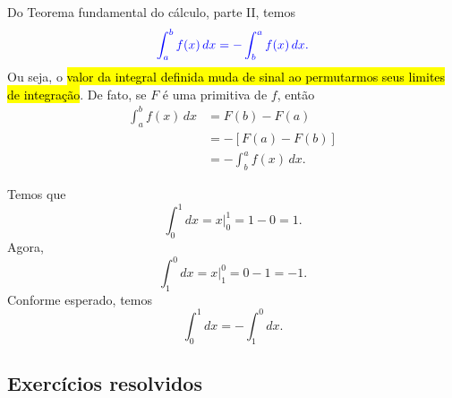 \begin{obs}
  Do Teorema fundamental do cálculo, parte II, temos
  \begin{equation}\color{blue}\int_a^b f(x)\,dx = - \int_b^a f(x)\,dx.
  \end{equation}
    Ou seja, o \hl{valor da integral definida muda de sinal ao permutarmos seus limites de integração}. De fato, se $F$ é uma primitiva de $f$, então
  \begin{align}
    \int_a^b f(x)\,dx &= F(b) - F(a) \\
                      &= - \left[F(a) - F(b)\right] \\
                      &= - \int_b^a f(x)\,dx.
  \end{align}
\end{obs}

\begin{ex}
  Temos que
  \begin{equation}
    \int_0^1 dx = \left. x\right|_0^1 = 1 - 0 = 1.
  \end{equation}
  Agora,
  \begin{equation}
    \int_1^0 dx = \left. x\right|_1^0 = 0 - 1 = -1.
  \end{equation}
  Conforme esperado, temos
  \begin{equation}
    \int_0^1 dx = - \int_1^0 dx.
  \end{equation}
\end{ex}

\subsection{Exercícios resolvidos}


